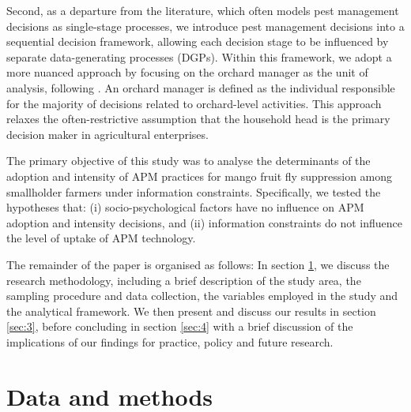 \documentclass[fleqn,twoside,reqno]{article}
\begin{document}
Second, as a departure from the literature, which often models pest management decisions as single-stage processes, we introduce pest management decisions into a sequential decision framework, allowing each decision stage to be influenced by separate data-generating processes (DGPs). Within this framework, we adopt a more nuanced approach by focusing on the orchard manager as the unit of analysis, following \cite{Miriti2021}. An orchard manager is defined as the individual responsible for the majority of decisions related to orchard-level activities. This approach relaxes the often-restrictive assumption that the household head is the primary decision maker in agricultural enterprises.

The primary objective of this study was to analyse the determinants of the adoption and intensity of APM practices for mango fruit fly suppression among smallholder farmers under information constraints. Specifically, we tested the hypotheses that: (i) socio-psychological factors have no influence on APM adoption and intensity decisions, and (ii) information constraints do not influence the level of uptake of APM technology.

The remainder of the paper is organised as follows: In section \ref{sec:2}, we discuss the research methodology, including a brief description of the study area, the sampling procedure and data collection, the variables employed in the study and the analytical framework. We then present and discuss our results in section \ref{sec:3}, before concluding in section \ref{sec:4} with a brief discussion of the implications of our findings for practice, policy and future research.

\section{Data and methods}\label{sec:2}
\end{document}
